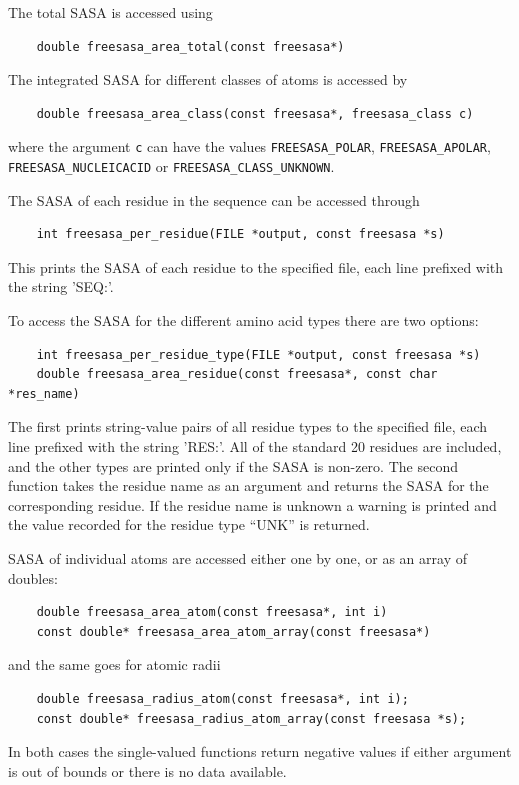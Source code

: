 \documentclass[a4paper,11pt]{article}
\begin{document}
The total SASA is accessed using
\begin{verbatim}
    double freesasa_area_total(const freesasa*)
\end{verbatim}
The integrated SASA for different classes of atoms is accessed by
\begin{verbatim}
    double freesasa_area_class(const freesasa*, freesasa_class c)
\end{verbatim}
where the argument \verb|c| can have the values \verb|FREESASA_POLAR|, 
\verb|FREESASA_APOLAR|, \verb|FREESASA_NUCLEICACID| or 
\verb|FREESASA_CLASS_UNKNOWN|.

The SASA of each residue in the sequence can be accessed through
\begin{verbatim}
    int freesasa_per_residue(FILE *output, const freesasa *s)
\end{verbatim}
This prints the SASA of each residue to the specified file, each
line prefixed with the string 'SEQ:'.

To access the SASA for the different amino acid types there are two
options:
\begin{verbatim}
    int freesasa_per_residue_type(FILE *output, const freesasa *s)
    double freesasa_area_residue(const freesasa*, const char *res_name)
\end{verbatim}
The first prints string-value pairs of all residue types to the
specified file, each line prefixed with the string 'RES:'. All of the
standard 20 residues are included, and the other types are printed
only if the SASA is non-zero.  The second function takes the residue
name as an argument and returns the SASA for the corresponding
residue. If the residue name is unknown a warning is printed and the
value recorded for the residue type ``UNK'' is returned.

SASA of individual atoms are accessed either one by one, or
as an array of doubles:
\begin{verbatim}
    double freesasa_area_atom(const freesasa*, int i)
    const double* freesasa_area_atom_array(const freesasa*)
\end{verbatim}
and the same goes for atomic radii
\begin{verbatim}
    double freesasa_radius_atom(const freesasa*, int i);
    const double* freesasa_radius_atom_array(const freesasa *s);
\end{verbatim}
In both cases the single-valued functions return negative values if
either argument is out of bounds or there is no data available. 
\end{document}

